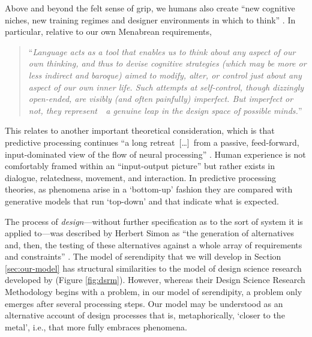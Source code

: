 Above and beyond the felt sense of grip, we humans also create ``new cognitive niches, new training regimes and designer environments in which to think'' \cite[p.~265]{pittphilsci10470}.  In particular, relative to our own Menabrean requirements,
\begin{quote}
``\emph{Language acts as a tool that enables us to think about any aspect of our own thinking, and thus to devise cognitive strategies (which may be more or less indirect and baroque) aimed to modify, alter, or control just about any aspect of our own inner life.  Such attempts at self-control, though dizzingly open-ended, are visibly (and often painfully) imperfect.  But imperfect or not, they represent~{\upshape[\ldots]}~a genuine leap in the design space of possible minds.}''
\end{quote}
This relates to another important theoretical consideration, which is that predictive processing continues ``a long retreat~[\ldots]~from a passive, feed-forward, input-dominated view of the flow of neural processing'' \cite[p.~2560]{Miller2018}.  Human experience is not comfortably framed within an “input-output picture” \cite{hurley2002consciousness} but rather exists in dialogue, relatedness, movement, and interaction.  In predictive processing theories, as phenomena arise in a `bottom-up' fashion they are compared with generative models that run `top-down' and that indicate what is expected.


The process of \emph{design}---without further specification as to the sort of system it is applied to---was described by Herbert Simon as ``the generation of alternatives and, then, the testing of these alternatives against a whole array of requirements and constraints'' \cite[pp.~128--129]{simon1996sciences}.  The model of serendipity that we will develop in Section \ref{sec:our-model} has structural similarities to the model of design science research developed by \citet{Peffers:2007:DSR:1481765.1481768} (Figure \ref{fig:dsrm}).  However, whereas their Design Science Research Methodology begins with a problem, in our model of serendipity, a problem only emerges after several processing steps.  Our model may be understood as an alternative account of design processes that is, metaphorically, `closer to the metal', i.e., that more fully embraces phenomena.

